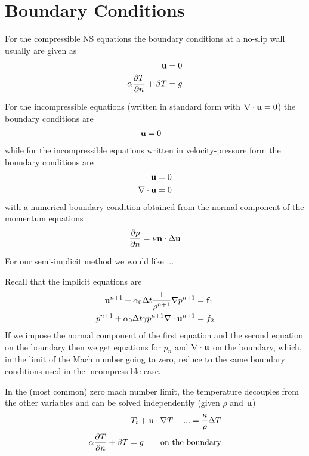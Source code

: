 \documentclass{article}
\begin{document}
\section{Boundary Conditions}


For the compressible NS equations the boundary conditions at a no-slip wall usually are given as
\begin{align}
  {\bf u} & = 0 \\
  \alpha {\partial T \over \partial n} + \beta T &= g
\end{align}

For the incompressible equations (written in standard form with $\nabla\cdot{\bf u}=0$) the boundary conditions
are
\begin{align}
  {\bf u} & = 0 
\end{align}
while for the incompressible equations written in velocity-pressure form the boundary conditions
are
\begin{align}
  {\bf u} & = 0 \\
  \nabla\cdot{\bf u} & = 0
\end{align}
with a numerical boundary condition obtained from the normal component of the momentum equations
\[
  {\partial p \over \partial n} = \nu {\bf n}\cdot\Delta {\bf u}
\]

For our semi-implicit method we would like ...


Recall that the implicit equations are
\begin{align}
   {\bf u}^{n+1} + \alpha_0 {\Delta t} {1\over\rho^{n+1}}\nabla p^{n+1} &= {\bf f}_1  \label{eq:ui} \\
   p^{n+1} + \alpha_0 {\Delta t} \gamma p^{n+1} \nabla\cdot{\bf u}^{n+1} &= f_2   \label{eq:pi}
\end{align}
If we impose the normal component of the first equation and the second equation on the boundary 
then we get equations for $p_n$ and $\nabla\cdot{\bf u}$ on
the boundary, which, in the limit of the Mach number going to zero, reduce to the same boundary conditions
used in the incompressible case.

In the (most common) zero mach number limit, the temperature decouples from the other variables and can be
solved independently (given $\rho$ and ${\bf u}$)
\begin{align}
  T_t + {\bf u}\cdot\nabla T + ... = {\kappa\over\rho} \Delta T \\
  \alpha {\partial T \over \partial n} + \beta T = g \qquad \mbox{on the boundary}
\end{align}
  

\end{document}
